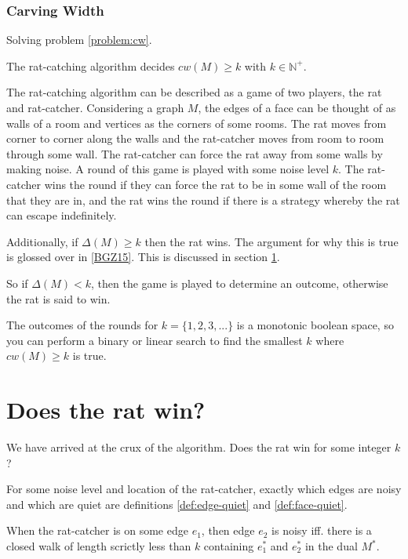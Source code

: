 \documentclass{article}
\begin{document}

		\subsubsection{Carving Width}

			Solving problem \ref{problem:cw}.

			The rat-catching algorithm decides $cw(M) \geq k$ with $k \in \mathbb{N}^+$.

			The rat-catching algorithm can be described as a game of two players, the rat and rat-catcher. Considering a graph $M$, the edges of a face can be thought of as walls of a room and vertices as the corners of some rooms. The rat moves from corner to corner along the walls and the rat-catcher moves from room to room through some wall. The rat-catcher can force the rat away from some walls by making noise. A round of this game is played with some noise level $k$. The rat-catcher wins the round if they can force the rat to be in some wall of the room that they are in, and the rat wins the round if there is a strategy whereby the rat can escape indefinitely.

			Additionally, if $\Delta(M) \geq k$ then the rat wins. The argument for why this is true is glossed over in \ref{BGZ15}. This is discussed in section \ref{}.

			So if $\Delta(M) < k$, then the game is played to determine an outcome, otherwise the rat is said to win.

			The outcomes of the rounds for $k=\{1,2,3,...\}$ is a monotonic boolean space, so you can perform a binary or linear search to find the smallest $k$ where $cw(M) \geq k$ is true.


	\section{Does the rat win?}

		We have arrived at the crux of the algorithm. Does the rat win for some integer $k$?

		For some noise level and location of the rat-catcher, exactly which edges are noisy and which are quiet are definitions \ref{def:edge-quiet} and \ref{def:face-quiet}.

		\begin{definition}\label{def:edge-quiet}
			When the rat-catcher is on some edge $e_1$, then edge $e_2$ is noisy iff. there is a closed walk of length scrictly less than $k$ containing $e_1^*$ and $e_2^*$ in the dual $M^*$.
		\end{definition}
\end{document}
